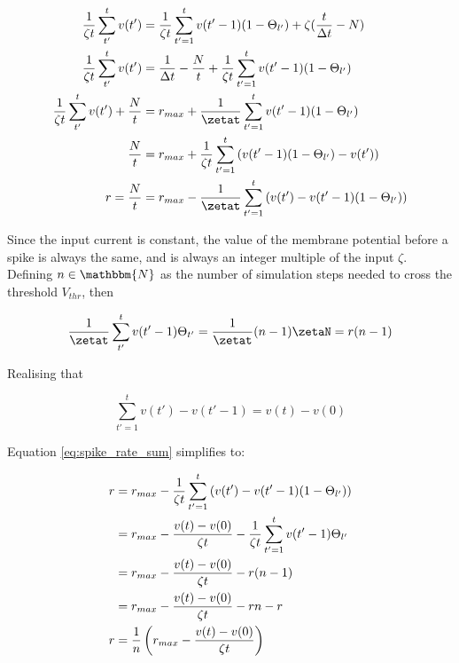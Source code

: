 \documentclass[report.tex]{subfiles}
\begin{document}
\begin{equation} 
\begin{split}
{1 \over \zeta t} \sum_{t'}^tv(t') &= {1 \over \zeta t} \sum_{t'=1}^t v(t' - 1)(1 - \Theta_{l'}) + \zeta({t \over \Delta t} - N) \\
{1 \over \zeta t} \sum_{t'}^tv(t') &= {1 \over \Delta t} - {N \over t} + {1 \over \zeta t} \sum_{t'=1}^t v(t' - 1)(1 - \Theta_{l'}) \\
{1 \over \zeta t} \sum_{t'}^tv(t') + {N \over t} &= r_{max} + {1 \over \zetat} \sum_{t'=1}^t v(t' - 1)(1 - \Theta_{l'}) \\
{N \over t} &= r_{max} + {1 \over \zeta t} \sum_{t'=1}^t \left(v(t' - 1)(1 - \Theta_{l'}) - v(t')\right) \\
r = {N \over t} &= r_{max} - {1 \over \zetat} \sum_{t'=1}^t \left(v(t') - v(t' - 1)(1 - \Theta_{l'})\right) \\
\end{split}
\label{eq:spike_rate_sum}
\end{equation}

\noindent
Since the input current is constant, the value of the membrane potential before a spike is always the same,
and is always an integer multiple of the input $\zeta$.
Defining $n \in \mathbbm{N}$ as the number of simulation steps needed to cross the threshold $V_{thr}$, then

\begin{equation}
{1 \over \zetat} \sum_{t'}^tv(t' - 1)\Theta_{t'} = {1 \over \zetat}(n - 1)\zetaN = r(n - 1)
\label{eq:time_threshold}
\end{equation}

\noindent
Realising that

\begin{equation}
\sum_{t'=1}^tv(t') - v(t' - 1) = v(t) - v(0)
\label{eq:sum_index_shuffle}
\end{equation}

\noindent
Equation \ref{eq:spike_rate_sum} simplifies to:

\begin{equation}
\begin{split}
r    &= r_{max} - {1 \over \zeta t} \sum_{t'=1}^t \left(v(t') - v(t' - 1)(1 - \Theta_{l'})\right) \\
     &= r_{max} - {v(t) - v(0) \over \zeta t} - {1 \over \zeta t} \sum_{t'=1}^t v(t' - 1)\Theta_{l'}\\
     &= r_{max} - {v(t) - v(0) \over \zeta t} - r(n - 1)\\
     &= r_{max} - {v(t) - v(0) \over \zeta t} - rn - r\\
r &= {1 \over n} \left(r_{max} - {v(t) - v(0) \over \zeta t}\right)
\end{split}
\label{eq:spike_rate}
\end{equation}
\end{document}
